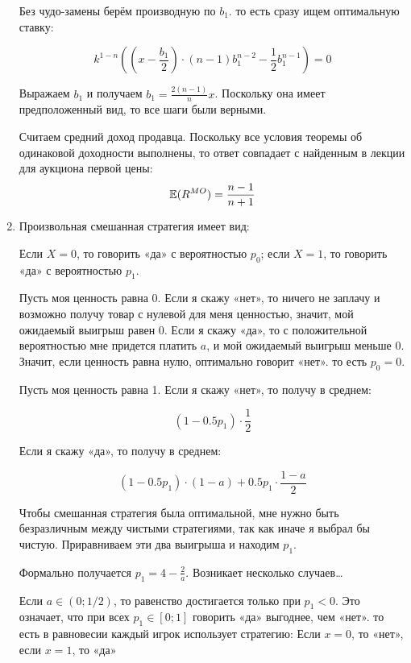 \begin{enumerate}
Без чудо-замены берём производную по $ b_{1} $. то есть сразу ищем оптимальную ставку:

\begin{equation}
k^{1-n}\left( \left( x-\frac{b_{1}}{2} \right)\cdot (n-1)b_{1}^{n-2}-\frac{1}{2}b_{1}^{n-1} \right)=0
\end{equation}

Выражаем $ b_{1} $ и получаем $ b_{1}=\frac{2(n-1)}{n}x $. Поскольку она имеет предположенный вид, то все шаги были верными.


Считаем средний доход продавца. Поскольку все условия теоремы об одинаковой доходности выполнены, то ответ совпадает с найденным в лекции для аукциона первой цены:
\begin{equation}
 \mathbb{E}(R^{MO})=\frac{n-1}{n+1}
\end{equation}


\item
Произвольная смешанная стратегия имеет вид:

Если $ X=0 $, то говорить «да» с вероятностью $ p_{0} $; если $ X=1 $, то говорить «да» с вероятностью $ p_{1} $.

Пусть моя ценность равна 0. Если я скажу «нет», то ничего не заплачу и возможно получу товар с нулевой для меня ценностью, значит, мой ожидаемый выигрыш равен 0. Если я скажу «да», то с положительной вероятностью мне придется платить $ a $, и мой ожидаемый выигрыш меньше 0. Значит, если ценность равна нулю, оптимально говорит  «нет». то есть $ p_{0}=0 $.

Пусть моя ценность равна 1. Если я скажу «нет», то получу в среднем:

\begin{equation}
(1-0.5p_{1})\cdot \frac{1}{2}
\end{equation}


Если я скажу «да», то получу в среднем:

\begin{equation}
(1-0.5p_{1})\cdot (1-a)+0.5p_{1}\cdot \frac{1-a}{2}
\end{equation}

Чтобы смешанная стратегия была оптимальной, мне нужно быть безразличным между чистыми стратегиями, так как иначе я выбрал бы чистую. Приравниваем эти два выигрыша и находим $ p_{1} $.

Формально получается $ p_{1}=4-\frac{2}{a}$. Возникает несколько случаев\ldots

Если $ a\in (0;1/2) $, то равенство достигается только при $ p_{1}<0 $. Это означает, что при всех $ p_{1}\in [0;1] $ говорить «да» выгоднее, чем «нет». то есть в равновесии каждый игрок использует стратегию: Если $ x=0 $, то «нет», если $ x=1 $, то «да»


\end{enumerate}

